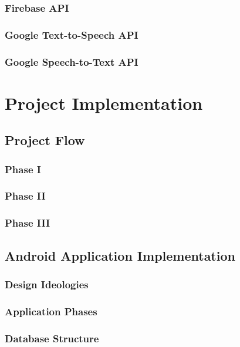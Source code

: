 \documentclass[14pt]{report}
\begin{document}
			\subsection{Firebase API}
			\subsection{Google Text-to-Speech API}
			\subsection{Google Speech-to-Text API}

	\newpage


	\chapter{Project Implementation}\label{chapter4}
		
	

		\section{Project Flow}
			\subsection{Phase I}
			\subsection{Phase II}
			\subsection{Phase III}

		\section{Android Application Implementation}
			\subsection{Design Ideologies}
			\subsection{Application Phases}
			\subsection{Database Structure}
		
\end{document}
